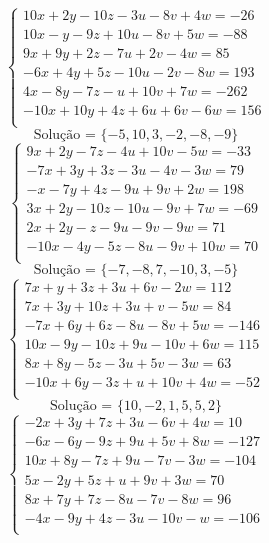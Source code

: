 \documentclass[12pt,oneside,a4paper]{article}
\begin{document}
\vspace{\baselineskip}
\begin{equation*}
\begin{cases}
10x+2y-10z-3u-8v+4w=-26 \\
10x-y-9z+10u-8v+5w=-88 \\
9x+9y+2z-7u+2v-4w=85 \\
-6x+4y+5z-10u-2v-8w=193 \\
4x-8y-7z-u+10v+7w=-262 \\
-10x+10y+4z+6u+6v-6w=156 \\
\end{cases}
\end{equation*}
\begin{equation*}
\text{Solução = }\{-5,10,3,-2,-8,-9\}
\end{equation*}
\vspace{\baselineskip}
\begin{equation*}
\begin{cases}
9x+2y-7z-4u+10v-5w=-33 \\
-7x+3y+3z-3u-4v-3w=79 \\
-x-7y+4z-9u+9v+2w=198 \\
3x+2y-10z-10u-9v+7w=-69 \\
2x+2y-z-9u-9v-9w=71 \\
-10x-4y-5z-8u-9v+10w=70 \\
\end{cases}
\end{equation*}
\begin{equation*}
\text{Solução = }\{-7,-8,7,-10,3,-5\}
\end{equation*}
\vspace{\baselineskip}
\begin{equation*}
\begin{cases}
7x+y+3z+3u+6v-2w=112 \\
7x+3y+10z+3u+v-5w=84 \\
-7x+6y+6z-8u-8v+5w=-146 \\
10x-9y-10z+9u-10v+6w=115 \\
8x+8y-5z-3u+5v-3w=63 \\
-10x+6y-3z+u+10v+4w=-52 \\
\end{cases}
\end{equation*}
\begin{equation*}
\text{Solução = }\{10,-2,1,5,5,2\}
\end{equation*}
\vspace{\baselineskip}
\begin{equation*}
\begin{cases}
-2x+3y+7z+3u-6v+4w=10 \\
-6x-6y-9z+9u+5v+8w=-127 \\
10x+8y-7z+9u-7v-3w=-104 \\
5x-2y+5z+u+9v+3w=70 \\
8x+7y+7z-8u-7v-8w=96 \\
-4x-9y+4z-3u-10v-w=-106 \\
\end{cases}
\end{equation*}
\end{document}
